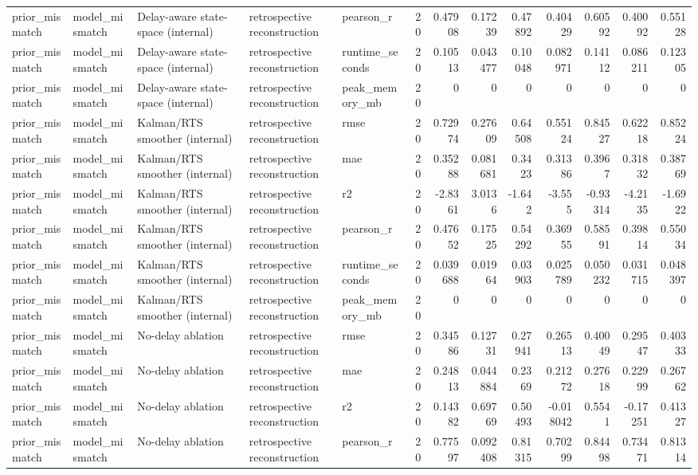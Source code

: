 \begin{table}[!htbp]
{{\begin{tabular}{lllllrrrrrrrr}
prior_mismatch & model_mismatch & Delay-aware state-space (internal) & retrospective reconstruction & pearson_r & 20 & 0.47908 & 0.17239 & 0.47892 & 0.40429 & 0.60592 & 0.40092 & 0.55128 \\
prior_mismatch & model_mismatch & Delay-aware state-space (internal) & retrospective reconstruction & runtime_seconds & 20 & 0.10513 & 0.043477 & 0.10048 & 0.082971 & 0.14112 & 0.086211 & 0.12305 \\
prior_mismatch & model_mismatch & Delay-aware state-space (internal) & retrospective reconstruction & peak_memory_mb & 20 & 0 & 0 & 0 & 0 & 0 & 0 & 0 \\
prior_mismatch & model_mismatch & Kalman/RTS smoother (internal) & retrospective reconstruction & rmse & 20 & 0.72974 & 0.27609 & 0.64508 & 0.55124 & 0.84527 & 0.62218 & 0.85224 \\
prior_mismatch & model_mismatch & Kalman/RTS smoother (internal) & retrospective reconstruction & mae & 20 & 0.35288 & 0.081681 & 0.3423 & 0.31386 & 0.3967 & 0.31832 & 0.38769 \\
prior_mismatch & model_mismatch & Kalman/RTS smoother (internal) & retrospective reconstruction & r2 & 20 & -2.8361 & 3.0136 & -1.642 & -3.555 & -0.93314 & -4.2135 & -1.6922 \\
prior_mismatch & model_mismatch & Kalman/RTS smoother (internal) & retrospective reconstruction & pearson_r & 20 & 0.47652 & 0.17525 & 0.54292 & 0.36955 & 0.58591 & 0.39814 & 0.55034 \\
prior_mismatch & model_mismatch & Kalman/RTS smoother (internal) & retrospective reconstruction & runtime_seconds & 20 & 0.039688 & 0.01964 & 0.03903 & 0.025789 & 0.050232 & 0.031715 & 0.048397 \\
prior_mismatch & model_mismatch & Kalman/RTS smoother (internal) & retrospective reconstruction & peak_memory_mb & 20 & 0 & 0 & 0 & 0 & 0 & 0 & 0 \\
prior_mismatch & model_mismatch & No-delay ablation & retrospective reconstruction & rmse & 20 & 0.34586 & 0.12731 & 0.27941 & 0.26513 & 0.40049 & 0.29547 & 0.40333 \\
prior_mismatch & model_mismatch & No-delay ablation & retrospective reconstruction & mae & 20 & 0.24813 & 0.044884 & 0.2369 & 0.21272 & 0.27618 & 0.22999 & 0.26762 \\
prior_mismatch & model_mismatch & No-delay ablation & retrospective reconstruction & r2 & 20 & 0.14382 & 0.69769 & 0.50493 & -0.018042 & 0.5541 & -0.17251 & 0.41327 \\
prior_mismatch & model_mismatch & No-delay ablation & retrospective reconstruction & pearson_r & 20 & 0.77597 & 0.092408 & 0.81315 & 0.70299 & 0.84498 & 0.73471 & 0.81314 \\

\end{tabular}}}
\end{table}
